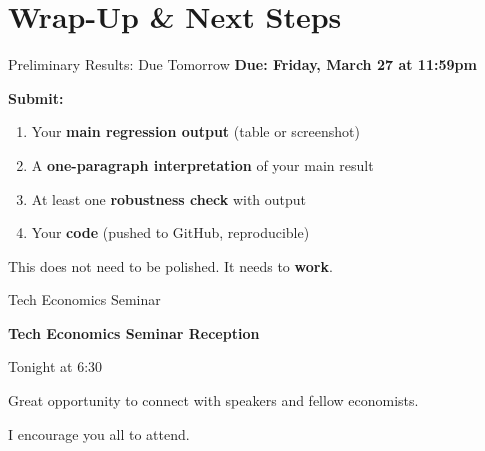 
\section{Wrap-Up \& Next Steps}

\begin{frame}{Preliminary Results: Due Tomorrow}
  \textbf{Due: Friday, March 27 at 11:59pm}

  \vspace{6pt}

  \textbf{Submit:}
  \begin{enumerate}
    \item Your \textbf{main regression output} (table or screenshot)
    \item A \textbf{one-paragraph interpretation} of your main result
    \item At least one \textbf{robustness check} with output
    \item Your \textbf{code} (pushed to GitHub, reproducible)
  \end{enumerate}

  \vspace{6pt}

  This does not need to be polished. It needs to \textbf{work}.
\end{frame}

\begin{frame}{Tech Economics Seminar}
  \centering
  \vspace{1cm}

  {\Large\textbf{\textcolor{usfgreen}{Tech Economics Seminar Reception}}}

  \vspace{8pt}

  {\large Tonight at 6:30}

  \vspace{12pt}

  Great opportunity to connect with speakers and fellow economists.

  \vspace{4pt}

  I encourage you all to attend.
\end{frame}

